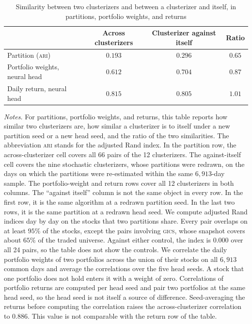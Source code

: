 \begin{table}[tb]
\centering
\caption{Similarity between two clusterizers and between a clusterizer and itself, in partitions, portfolio weights, and returns}
\label{tab:gradient}
\begin{threeparttable}
\small
\begin{tabular}{@{}lccc@{}}
\toprule
& Across clusterizers & Clusterizer against itself & Ratio \\
\midrule
Partition (\textsc{ari}) & $0.193$ & $0.296$ & $0.65$ \\
Portfolio weights, neural head & $0.612$ & $0.704$ & $0.87$ \\
Daily return, neural head & $0.815$ & $0.805$ & $1.01$ \\
\bottomrule
\end{tabular}
\begin{tablenotes}[flushleft]\footnotesize
\item \emph{Notes.} For partitions, portfolio weights, and returns, this table reports how similar two clusterizers are, how similar a clusterizer is to itself under a new partition seed or a new head seed, and the ratio of the two similarities. The abbreviation \textsc{ari} stands for the adjusted Rand index. In the partition row, the across-clusterizer cell covers all 66 pairs of the 12 clusterizers. The against-itself cell covers the nine stochastic clusterizers, whose partitions were redrawn, on the days on which the partitions were re-estimated within the same $6{,}913$-day sample. The portfolio-weight and return rows cover all 12 clusterizers in both columns. The ``against itself'' column is not the same object in every row. In the first row, it is the same algorithm
at a redrawn partition seed. In the last two rows, it is the same partition
at a redrawn head seed. We compute adjusted Rand indices day
by day on the stocks that two partitions share. Every pair overlaps on at least $95\%$ of the stocks,
except the pairs involving \textsc{gics}, whose snapshot covers about $65\%$ of the traded universe. Against either control, the index is $0.000$ over all 24 pairs, so the table does not show the controls. We correlate the daily portfolio weights of two portfolios across the union of their stocks on all $6{,}913$ common days and average the correlations over the five head seeds. A stock that one portfolio does not hold enters it with a weight of zero. Correlations of portfolio returns are computed per head seed and pair two portfolios at the same
head seed, so the head seed is not itself a source of difference. Seed-averaging the returns before computing the correlation raises the across-clusterizer correlation to $0.886$. This value is not comparable with the return row of the table.
\end{tablenotes}
\end{threeparttable}
\end{table}


